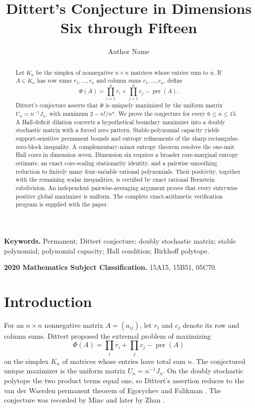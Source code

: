 \documentclass[11pt]{article}
\title{Dittert's Conjecture in Dimensions Six through Fifteen}
\author{Author Name}
\date{}
\theoremstyle{definition}
\newcommand{\per}{\operatorname{per}}
\newcommand{\1}{\mathbf{1}}
\begin{document}
\maketitle

\begin{abstract}
Let $K_n$ be the simplex of nonnegative $n\times n$ matrices whose entries
sum to $n$.  If $A\in K_n$ has row sums $r_1,\dots,r_n$ and column sums
$c_1,\dots,c_n$, define
\[
 \Phi(A)=\prod_{i=1}^n r_i+\prod_{j=1}^n c_j-\per(A).
\]
Dittert's conjecture asserts that $\Phi$ is uniquely maximized by the
uniform matrix $U_n=n^{-1}J_n$, with maximum $2-n!/n^n$.  We prove the
conjecture for every $6\le n\le15$.  A Hall-deficit dilation converts a
hypothetical boundary maximizer into a doubly stochastic matrix with a forced
zero pattern.  Stable-polynomial capacity yields support-sensitive permanent
bounds and entropy refinements of the sharp rectangular-zero-block
inequality.  A complementary-minor entropy theorem resolves the one-unit
Hall cores in dimension seven.  Dimension six requires a broader
core-marginal entropy estimate, an exact core-scaling stationarity identity,
and a pairwise smoothing reduction to finitely many four-variable rational
polynomials.  Their positivity, together with the remaining scalar
inequalities, is certified by exact rational Bernstein subdivision.  An
independent pairwise-averaging argument proves that every entrywise positive
global maximizer is uniform.  The complete exact-arithmetic verification
program is supplied with the paper.
\end{abstract}

\noindent\textbf{Keywords.}
Permanent; Dittert conjecture; doubly stochastic matrix; stable polynomial; polynomial capacity; Hall condition; Birkhoff polytope.

\medskip
\noindent\textbf{2020 Mathematics Subject Classification.}
15A15, 15B51, 05C70.

\section{Introduction}

For an $n\times n$ nonnegative matrix $A=(a_{ij})$, let $r_i$ and $c_j$
denote its row and column sums.  Dittert proposed the extremal problem of
maximizing
\[
 \Phi(A)=\prod_i r_i+\prod_j c_j-\per(A)
\]
on the simplex $K_n$ of matrices whose entries have total sum $n$.  The
conjectured unique maximizer is the uniform matrix $U_n=n^{-1}J_n$.  On the
doubly stochastic polytope the two product terms equal one, so Dittert's
assertion reduces to the van der Waerden permanent theorem of Egorychev and
Falikman \cite{Egorychev1981,Falikman1981}.  The conjecture was recorded by
Minc \cite{Minc1983} and later by Zhan \cite{Zhan2007}.
\end{document}
